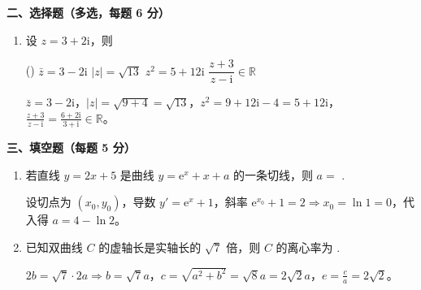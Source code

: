 \noindent\textbf{二、选择题（多选，每题 6 分）}
\begin{enumerate}[start=4, itemsep=\msqItemSep]
    \item 设 $z = 3 + 2\mathrm{i}$，则
    \begin{tasks}(\msqTasksCols)
        \task $\bar{z} = 3 - 2\mathrm{i}$
        \task $|z| = \sqrt{13}$
        \task $z^2 = 5 + 12\mathrm{i}$
        \task $\dfrac{z+3}{z-\mathrm{i}} \in \mathbb{R}$
    \end{tasks}
    \begin{solution}
        \jieti $\bar{z}=3-2\mathrm{i}$，$|z|=\sqrt{9+4}=\sqrt{13}$，$z^2=9+12\mathrm{i}-4=5+12\mathrm{i}$，$\frac{z+3}{z-\mathrm{i}}=\frac{6+2\mathrm{i}}{3+\mathrm{i}}\in\mathbb{R}$。
    \end{solution}
\end{enumerate}

\noindent\textbf{三、填空题（每题 5 分）}
\begin{enumerate}[start=5, itemsep=\blankItemSep]
    \item 若直线 $y=2x+5$ 是曲线 $y=\mathrm{e}^x+x+a$ 的一条切线，则 $a=$ \blank.
    \begin{solution}
        \jieti 设切点为 $(x_0, y_0)$，导数 $y'=\mathrm{e}^x+1$，斜率 $\mathrm{e}^{x_0}+1=2\Rightarrow x_0=\ln 1=0$，代入得 $a=4-\ln 2$。
    \end{solution}

    \item 已知双曲线 $C$ 的虚轴长是实轴长的 $\sqrt{7}$ 倍，则 $C$ 的离心率为 \blank.
    \begin{solution}
        \jieti $2b=\sqrt{7}\cdot 2a\Rightarrow b=\sqrt{7}a$，$c=\sqrt{a^2+b^2}=\sqrt{8}a=2\sqrt{2}a$，$e=\frac{c}{a}=2\sqrt{2}$。
    \end{solution}
\end{enumerate}

